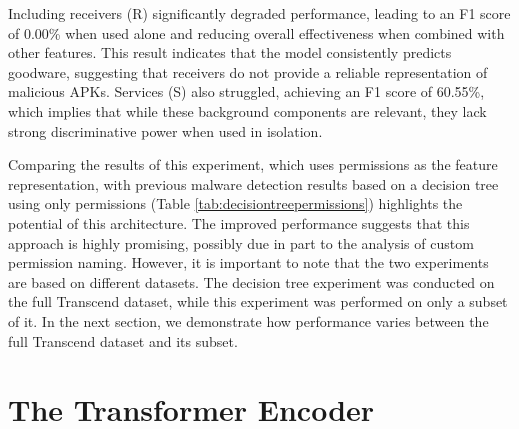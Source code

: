 Including receivers (R) significantly degraded performance, 
leading to an F1 score of 0.00\% when used alone and reducing overall effectiveness when combined with other features. 
This result indicates that the model consistently predicts goodware, 
suggesting that receivers do not provide a reliable representation of malicious APKs. 
Services (S) also struggled, achieving an F1 score of 60.55\%, 
which implies that while these background components are relevant, 
they lack strong discriminative power when used in isolation.

Comparing the results of this experiment, which uses permissions as the feature representation, 
with previous malware detection results based on a decision tree using only permissions 
(Table \ref{tab:decisiontreepermissions}) highlights the potential of this architecture. 
The improved performance suggests that this approach is highly promising, 
possibly due in part to the analysis of custom permission naming. 
However, it is important to note that the two experiments are based on different datasets. 
The decision tree experiment was conducted on the full Transcend dataset, 
while this experiment was performed on only a subset of it. 
In the next section, we demonstrate how performance varies between the full Transcend dataset and its subset.

\section{The Transformer Encoder}
\label{sec:tran_enc}

\begin{table}[b!]
    \caption{\label{tab:apk_representation_results_unfrozen}%
    Performance of different APK representations using \emph{unfrozen} ModernBERT embeddings. Features are extracted from the Android manifest.xml (A=Activities, P=Permissions, R=Receivers, S=Services). The encoder was also trained through backpropagation in this experiment.}
\end{table}


